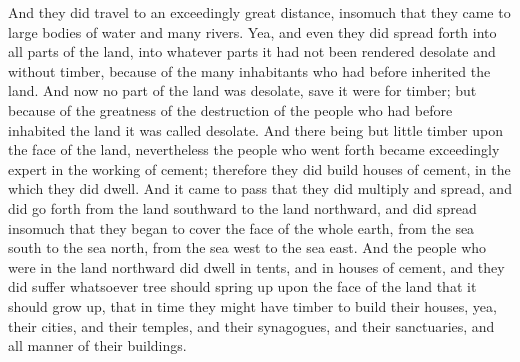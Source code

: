 And they did travel to an exceedingly great distance, insomuch that they came to large bodies of water and many rivers.
\bverse \iffalse Yea, and even they did spread forth into all parts of the land, into whatever parts it had not been rendered desolate and without timber, because of the many inhabitants who had before inherited the land. \fi
Yea, and even they did spread forth into all parts of the land, into whatever parts it had not been rendered desolate and without timber, because of the many inhabitants who had before inherited the land.
\bverse \iffalse And now no part of the land was desolate, save it were for timber; but because of the greatness of the destruction of the people who had before inhabited the land it was called desolate. \fi
And now no part of the land was desolate, save it were for timber; but because of the greatness of the destruction of the people who had before inhabited the land it was called desolate.
\bverse \iffalse And there being but little timber upon the face of the land, nevertheless the people who went forth became exceedingly expert in the working of cement; therefore they did build houses of cement, in the which they did dwell. \fi
And there being but little timber upon the face of the land, nevertheless the people who went forth became exceedingly expert in the working of cement; therefore they did build houses of cement, in the which they did dwell.
\bverse \iffalse And it came to pass that they did multiply and spread, and did go forth from the land southward to the land northward, and did spread insomuch that they began to cover the face of the whole earth, from the sea south to the sea north, from the sea west to the sea east. \fi
And it came to pass that they did multiply and spread, and did go forth from the land southward to the land northward, and did spread insomuch that they began to cover the face of the whole earth, from the sea south to the sea north, from the sea west to the sea east.
\bverse \iffalse And the people who were in the land northward did dwell in tents, and in houses of cement, and they did suffer whatsoever tree should spring up upon the face of the land that it should grow up, that in time they might have timber to build their houses, yea, their cities, and their temples, and their synagogues, and their sanctuaries, and all manner of their buildings. \fi
And the people who were in the land northward did dwell in tents, and in houses of cement, and they did suffer whatsoever tree should spring up upon the face of the land that it should grow up, that in time they might have timber to build their houses, yea, their cities, and their temples, and their synagogues, and their sanctuaries, and all manner of their buildings.
